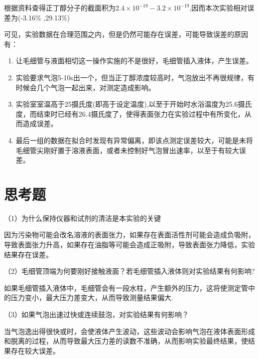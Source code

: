 \documentclass[hyperref,a4paper,UTF8]{ctexart}
\begin{document}
根据资料查得正丁醇分子的截面积为$2.4\times 10^{-19}-3.2\times10^{-19}$,因而本次实验相对误差为(-3.16\% ,29.13\%)

可见，实验数据在合理范围之内，但是仍然可能存在误差，可能导致误差的原因有：
\begin{enumerate}
    \item 让毛细管与液面相切这一操作实施的不是很好，毛细管插入液体，产生误差。
    \item 实验要求气泡5-10s出一个，但当正丁醇浓度较高时，气泡放出不再很规律，有时候会几个气泡一起出来，对测定造成影响。
    \item 实验室室温高于25摄氏度(即高于设定温度),以至于开始时水浴温度为25.6摄氏度，而结束时已经有26.4摄氏度了，使得表面张力在实验过程中有所变化，从而造成误差。
    \item 最后一组的数据在拟合时发现有异常偏离，即该点测定误差较大，可能是未将毛细管尖刚好置于溶液表面，或者未控制好气泡冒出速率，以至于有较大误差。
\end{enumerate}


\section{思考题}
（1）为什么保持仪器和试剂的清洁是本实验的关键


因为污染物可能会改名溶液的表面张力，如果存在表面活性剂可能会造成负吸附，导致表面张力升高，如果存在油脂等可能会造成正吸附，导致表面张力降低，实验结果存在误差。


（2）毛细管顶端为何要刚好接触液面？若毛细管插入液体则对实验结果有何影响?


如果毛细管插入液体中，毛细管会有一段水柱，产生额外的压力，这将使测定管中的压力变小，最大压力差变大，从而导致测量结果偏大.


（3）如果气泡出速过快或连续鼓泡，对实验结果有何影响？


当气泡逸出得很快或时，会使液体产生波动，这些波动会影响气泡在液体表面形成和脱离的过程，从而导致最大压力差的读数不准确，从而影响实验最终结果，使结果存在较大误差。
\newpage
\end{document}

